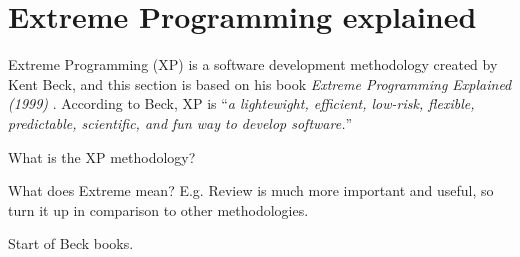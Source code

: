 \section{Extreme Programming explained}
Extreme Programming (XP) is a software development methodology created by Kent Beck, and this section is based on his book \textit{Extreme Programming Explained (1999)} \citep{xp:explained}. 
According to Beck, XP is ``\textit{a lightewight, efficient, low-risk, flexible, predictable, scientific, and fun way to develop software.}''




What is the XP methodology?

What does Extreme mean? E.g. Review is much more important and useful, so turn it up in comparison to other methodologies.

Start of Beck books.

